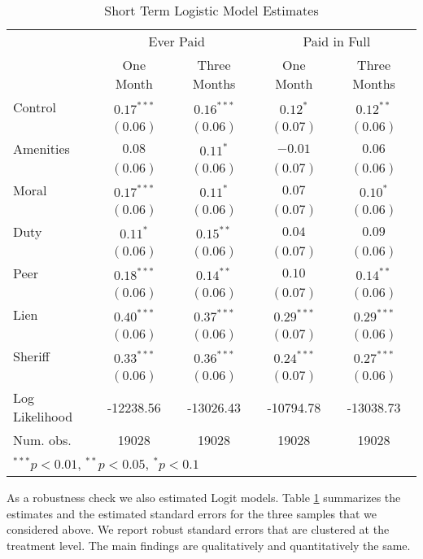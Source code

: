 \documentclass[12pt]{article}
\begin{document}
\begin{table}[htbp]
\caption{Short Term Logistic Model Estimates}\label{sh_logit}
\bigskip
\centering
\begin{tabular}{l c c c c }
\hline
 & \multicolumn{2}{c}{Ever Paid} & \multicolumn{2}{c}{Paid in Full} \\
               & One Month & Three Months & One Month & Three Months \\
\hline
Control        & $0.17^{***}$ & $0.16^{***}$ & $0.12^{*}$   & $0.12^{**}$  \\
               & $(0.06)$     & $(0.06)$     & $(0.07)$     & $(0.06)$     \\
Amenities      & $0.08$       & $0.11^{*}$   & $-0.01$      & $0.06$       \\
               & $(0.06)$     & $(0.06)$     & $(0.07)$     & $(0.06)$     \\
Moral          & $0.17^{***}$ & $0.11^{*}$   & $0.07$       & $0.10^{*}$   \\
               & $(0.06)$     & $(0.06)$     & $(0.07)$     & $(0.06)$     \\
Duty           & $0.11^{*}$   & $0.15^{**}$  & $0.04$       & $0.09$       \\
               & $(0.06)$     & $(0.06)$     & $(0.07)$     & $(0.06)$     \\
Peer           & $0.18^{***}$ & $0.14^{**}$  & $0.10$       & $0.14^{**}$  \\
               & $(0.06)$     & $(0.06)$     & $(0.07)$     & $(0.06)$     \\
Lien           & $0.40^{***}$ & $0.37^{***}$ & $0.29^{***}$ & $0.29^{***}$ \\
               & $(0.06)$     & $(0.06)$     & $(0.07)$     & $(0.06)$     \\
Sheriff        & $0.33^{***}$ & $0.36^{***}$ & $0.24^{***}$ & $0.27^{***}$ \\
               & $(0.06)$     & $(0.06)$     & $(0.07)$     & $(0.06)$     \\
\hline
Log Likelihood & -12238.56    & -13026.43    & -10794.78    & -13038.73    \\
Num. obs.      & 19028        & 19028        & 19028        & 19028        \\
\hline
\multicolumn{5}{l}{\scriptsize{$^{***}p<0.01$, $^{**}p<0.05$, $^*p<0.1$}}
\end{tabular}
\end{table}

As a robustness check we also estimated Logit models. Table
\ref{sh_logit} summarizes the estimates and the estimated standard
errors for the three samples that we considered above. We report
robust standard errors that are clustered at the treatment level. The main
findings are qualitatively and quantitatively the same.
\end{document}
